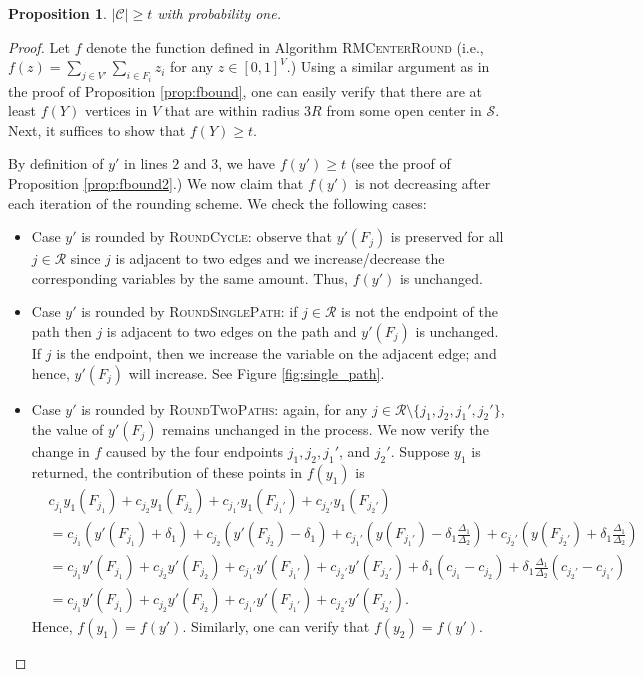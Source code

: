 \documentclass[a4paper,11pt]{article}
\newtheorem{proposition}[theorem]{Proposition}
\newcommand{\C}{\mathcal{C}}
\renewcommand{\S}{\mathcal{S}}
\newcommand{\R}{\mathcal{R}}
\begin{document}
\begin{proposition} $|\C| \geq t$ with probability one.
\end{proposition}
\begin{proof}
Let $f$ denote the function defined in Algorithm \textsc{RMCenterRound} (i.e., $f(z) = \sum_{j \in V'} \sum_{i \in F_i}z_i$ for any $z \in [0,1]^V$.) Using a similar argument as in the proof of Proposition \ref{prop:fbound}, one can easily verify that there are at least $f(Y)$ vertices in $V$ that are within radius $3R$ from some open center in $\S$. Next, it suffices to show that $f(Y) \geq t$.

By definition of $y'$ in lines $2$ and $3$, we have $f(y') \geq t$ (see the proof of Proposition \ref{prop:fbound2}.) We now claim that $f(y')$ is not decreasing after each iteration of the rounding scheme. We check the following cases:
\begin{itemize}
	\item Case $y'$ is rounded by \textsc{RoundCycle}: observe that $y'(F_j)$ is preserved for all $j \in \R$ since $j$ is adjacent to two edges and we increase/decrease the corresponding variables by the same amount. Thus, $f(y')$ is unchanged.
	\item Case $y'$ is rounded by \textsc{RoundSinglePath}: if $j \in \R$ is not the endpoint of the path then $j$ is adjacent to two edges on the path and $y'(F_j)$ is unchanged. If $j$ is the endpoint, then we increase the variable on the adjacent edge; and hence, $y'(F_j)$ will increase. See Figure \ref{fig:single_path}.
	
	\item Case $y'$ is rounded by \textsc{RoundTwoPaths}: again, for any $j \in \R \setminus \{j_1, j_2, j_1', j_2'\}$,  the value of $y'(F_j)$ remains unchanged in the process. We now verify the change in $f$ caused by the four endpoints $j_1, j_2, j_1'$, and $j_2'$. Suppose $y_1$ is returned, the contribution of these points in $f(y_1)$ is
	\begin{align*}
		& c_{j_1}y_1(F_{j_1}) + c_{j_2}y_1(F_{j_2})+ 
		c_{j_1'}y_1(F_{j_1'}) + c_{j_2'}y_1(F_{j_2'}) \\
		& =  c_{j_1}(y'(F_{j_1})+\delta_1) + c_{j_2}(y'(F_{j_2})-\delta_1) +
		c_{j_1'}\left(y(F_{j_1'})-\delta_1 \frac{\Delta_1}{\Delta_2}\right) + c_{j_2'}\left(y(F_{j_2'})+\delta_1\frac{\Delta_1}{\Delta_2}\right) \\
		&=  c_{j_1}y'(F_{j_1}) + c_{j_2}y'(F_{j_2})+ 
		c_{j_1'}y'(F_{j_1'}) + c_{j_2'}y'(F_{j_2'}) + \delta_1(c_{j_1}-c_{j_2})+ \delta_1\frac{\Delta_1}{\Delta_2}(c_{j_2'}-c_{j_1'}) \\
		&= c_{j_1}y'(F_{j_1}) + c_{j_2}y'(F_{j_2})+ 
		c_{j_1'}y'(F_{j_1'}) + c_{j_2'}y'(F_{j_2'}) .
	\end{align*}
Hence, $f(y_1) = f(y')$. Similarly, one can verify that $f(y_2) = f(y')$.
	

\end{itemize}
\end{proof}
\end{document}
